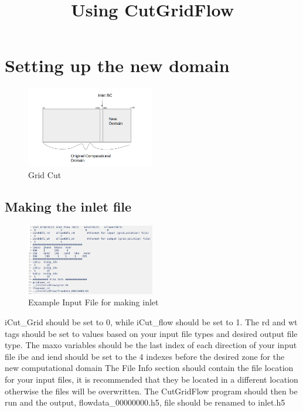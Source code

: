 \documentclass[12pt, oneside]{article}
\title{Using CutGridFlow}
\author{}
\begin{document}
\section{Setting up the new domain}


\begin{figure}[H]
\centering
\includegraphics[width=0.5\textwidth]{FIGS/GridCut.png}

\caption{{\footnotesize Grid Cut}}
\label{fig: } 
\end{figure}

\subsection{Making the inlet file }

\begin{figure}[H]
\centering
\includegraphics[width=0.5\textwidth]{FIGS/ExampleInlet.png}

\caption{Example Input File for making inlet}
\label{fig: } 
\end{figure}

iCut\_Grid should be set to 0, while iCut\_flow should be set to 1. \newline
The rd and wt tags should be set to values based on your input file types and desired output file type. \newline
The maxo variables should be the last index of each direction of your input file \newline
ibe and iend should be set to the 4 indexes before the desired zone for the new computational domain \newline
The File Info section should contain the file location for your input files, it is \newline recommended that they be located in a different location otherwise the files will be overwritten. \newline
The CutGridFlow program should then be run and the output, flowdata\_00000000.h5, file should be renamed to inlet.h5
\end{document}
